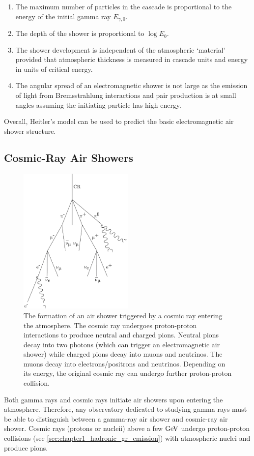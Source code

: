 \begin{enumerate}
    \itemsep0em
	\item The maximum number of particles in the cascade is proportional to the energy of the initial gamma ray $E_{\gamma,0}$.
	\item The depth of the shower is proportional to $\log E_0$.
	\item The shower development is independent of the atmospheric `material' provided that atmospheric thickness is measured in cascade units and energy in units of critical energy.
    \item The angular spread of an electromagnetic shower is not large as the emission of light from Bremsstrahlung interactions and pair production is at small angles assuming the initiating particle has high energy.
\end{enumerate}
\noindent Overall, Heitler's model can be used to predict the basic electromagnetic air shower structure.

\subsection{Cosmic-Ray Air Showers}
\begin{figure}
    \includegraphics[width=0.5\textwidth]{05_Astronomy/Images/air_shower/cosmic_ray.pdf}
    \caption{The formation of an air shower triggered by a cosmic ray entering the atmosphere. The cosmic ray undergoes proton-proton interactions to produce neutral and charged pions. Neutral pions decay into two photons (which can trigger an electromagnetic air shower) while charged pions decay into muons and neutrinos. The muons decay into electrons/positrons and neutrinos. Depending on its energy, the original cosmic ray can undergo further proton-proton collision.}
    \label{fig:chapter_2_air_shower_hadron}
\end{figure}
Both gamma rays and cosmic rays initiate air showers upon entering the atmosphere. Therefore, any observatory dedicated to studying gamma rays must be able to distinguish between a gamma-ray air shower and cosmic-ray air shower.
\newpar
Cosmic rays (protons or nucleii) above a few $\si{\giga\electronvolt}$ undergo proton-proton collisions (see \autoref{sec:chapter1_hadronic_gr_emission}) with atmospheric nuclei and produce pions.

